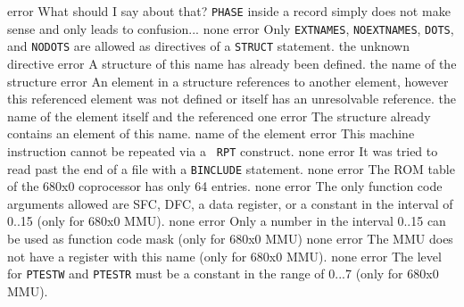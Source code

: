 \documentclass[12pt,twoside]{report}
\newcommand{\tty}[1]{{\tt #1}}
\begin{document}
\begin{description}
               {error}
               {What should I say about that?  \tty{PHASE} inside a record
                simply does not make sense and only leads to
                confusion...}
               {none}
\errentry{1554}{invalid \tty{STRUCT} directive}
               {error}
               {Only \tty{EXTNAMES}, \tty{NOEXTNAMES}, \tty{DOTS},
                and \tty{NODOTS} are allowed as directives of a
                \tty{STRUCT} statement.}
               {the unknown directive}
               {error}
               {A structure of this name has already been defined.}
               {the name of the structure}
               {error}
               {An element in a structure references to another
                element, however this referenced element was not
                defined or itself has an unresolvable reference.}
               {the name of the element itself and the referenced one}
               {error}
               {The structure already contains an element of this name.}
               {name of the element}
               {error}
               {This machine instruction cannot be repeated via a {\tt
                RPT} construct.}
               {none}
               {error}
               {It was tried to read past the end of a file with a
                \tty{BINCLUDE} statement.}
               {none}
               {error}
               {The ROM table of the 680x0 coprocessor has only 64 entries.}
               {none}
               {error}
               {The only function code arguments allowed are SFC, DFC, a
                data register, or a constant in the interval of 0..15 (only
                for 680x0 MMU).}
               {none}
               {error}
               {Only a number in the interval 0..15 can be used as
                function code mask (only for 680x0 MMU)}
               {none}
               {error}
               {The MMU does not have a register with this name (only for
                680x0 MMU).}
               {none}
               {error}
               {The level for \tty{PTESTW} and \tty{PTESTR} must be a constant in the
                range of 0...7 (only for 680x0 MMU).}

\end{description}
\end{document}
